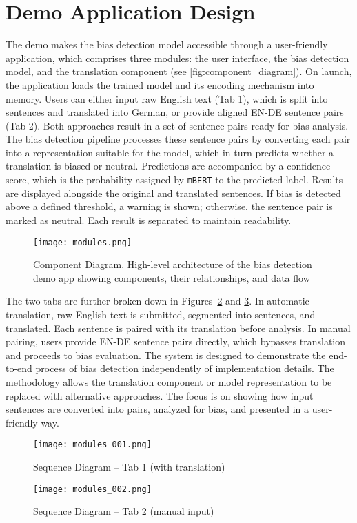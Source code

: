 \section{Demo Application Design}
    The demo makes the bias detection model accessible through a user-friendly application, which comprises three modules: the user interface, the bias detection model, and the translation component (see \autoref{fig:component_diagram}). On launch, the application loads the trained model and its encoding mechanism into memory. Users can either input raw English text (Tab 1), which is split into sentences and translated into German, or provide aligned EN-DE sentence pairs (Tab 2). Both approaches result in a set of sentence pairs ready for bias analysis. The bias detection pipeline processes these sentence pairs by converting each pair into a representation suitable for the model, which in turn predicts whether a translation is biased or neutral. Predictions are accompanied by a confidence score, which is the probability assigned by \texttt{mBERT} to the predicted label. Results are displayed alongside the original and translated sentences. If bias is detected above a defined threshold, a warning is shown; otherwise, the sentence pair is marked as neutral. Each result is separated to maintain readability.

    \vspace{0.8em}
    \begin{figure}[htb]
    \centering
    \texttt{[image: modules.png]}
    \caption[Component Diagram]{Component Diagram. High-level architecture of the bias detection demo app showing components, their relationships, and data flow}
    \label{fig:component_diagram}
    \end{figure}

    The two tabs are further broken down in Figures~\ref{fig:sequence_diagram_1} and \ref{fig:sequence_diagram_2}. In automatic translation, raw English text is submitted, segmented into sentences, and translated. Each sentence is paired with its translation before analysis. In manual pairing, users provide EN-DE sentence pairs directly, which bypasses translation and proceeds to bias evaluation. The system is designed to demonstrate the end-to-end process of bias detection independently of implementation details. The methodology allows the translation component or model representation to be replaced with alternative approaches. The focus is on showing how input sentences are converted into pairs, analyzed for bias, and presented in a user-friendly way. 

    \vspace{0.8em}
    \begin{figure}[H]
    \centering
    \texttt{[image: modules\_001.png]}
    \caption{Sequence Diagram – Tab 1 (with translation)}
    \label{fig:sequence_diagram_1}
    \end{figure}

    \begin{figure}[H]
    \centering
    \texttt{[image: modules\_002.png]}
    \caption{Sequence Diagram – Tab 2 (manual input)}
    \label{fig:sequence_diagram_2}
    \end{figure}
